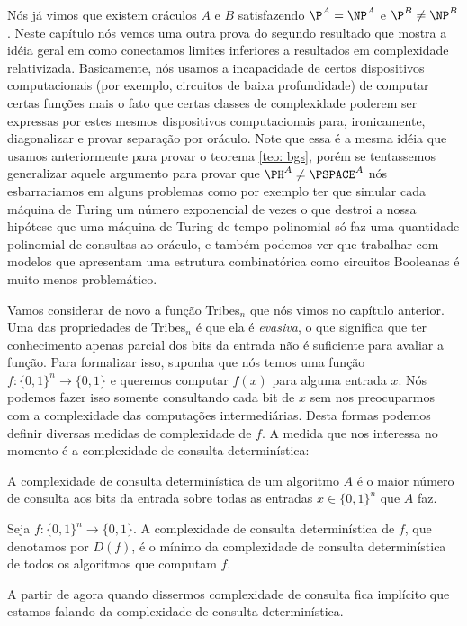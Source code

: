 Nós já vimos que existem oráculos $A$ e $B$ satisfazendo $\P^{A} = \NP^{A}$ e $\P^{B} \neq \NP^{B}$. Neste capítulo nós vemos uma outra prova do segundo resultado que mostra a idéia geral em como conectamos limites inferiores a resultados em complexidade relativizada. Basicamente, nós usamos a incapacidade de certos dispositivos computacionais (por exemplo, circuitos de baixa profundidade) de computar certas funções mais o fato que certas classes de complexidade poderem ser expressas por estes mesmos dispositivos computacionais para, ironicamente, diagonalizar e provar separação por oráculo. Note que essa é a mesma idéia que usamos anteriormente para provar o teorema \ref{teo: bgs}, porém se tentassemos generalizar aquele argumento para provar que $\PH^{A} \neq \PSPACE^{A}$ nós esbarrariamos em alguns problemas como por exemplo ter que simular cada máquina de Turing um número exponencial de vezes o que destroi a nossa hipótese que uma máquina de Turing de tempo polinomial só faz uma quantidade polinomial de consultas ao oráculo, e também podemos ver que trabalhar com modelos que apresentam uma estrutura combinatórica como circuitos Booleanas é muito menos problemático.

Vamos considerar de novo a função Tribes$_{n}$ que nós vimos no capítulo anterior. Uma das propriedades de Tribes$_{n}$ é que ela é \emph{evasiva}, o que significa que ter conhecimento apenas parcial dos bits da entrada não é suficiente para avaliar a função. Para formalizar isso, suponha que nós temos uma função $f: \{0, 1\}^{n} \to \{0, 1\}$ e queremos computar $f(x)$ para alguma entrada $x$. Nós podemos fazer isso somente consultando cada bit de $x$ sem nos preocuparmos com a complexidade das computações intermediárias. Desta formas podemos definir diversas medidas de complexidade de $f$. A medida que nos interessa no momento é a complexidade de consulta determinística:

\begin{defi}

A complexidade de consulta determinística de um algoritmo $A$ é o maior número de consulta aos bits da entrada sobre todas as entradas $x \in \{0, 1\}^{n}$ que $A$ faz.

Seja $f: \{0, 1\}^{n} \to \{0, 1\}$. A complexidade de consulta determinística de $f$, que denotamos por $D(f)$, é o mínimo da complexidade de consulta determinística de todos os algoritmos que computam $f$.

\end{defi}

A partir de agora quando dissermos complexidade de consulta fica implícito que estamos falando da complexidade de consulta determinística.

